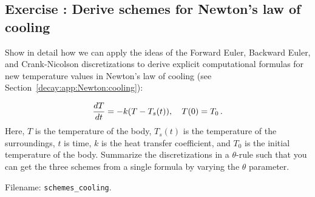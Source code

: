 \documentclass[%
oneside,                 %
final,                   %
10pt]{article}
\newenvironment{doconceexercise}{}{}
\newcounter{doconceexercisecounter}
\begin{document}
\begin{doconceexercise}

\subsection*{Exercise \thedoconceexercisecounter: Derive schemes for Newton's law of cooling}

\label{decay:app:exer:cooling:schemes}

Show in detail how we can apply the ideas of the Forward Euler,
Backward Euler, and Crank-Nicolson
discretizations to derive explicit
computational formulas for new temperature values in Newton's law of
cooling (see Section~\ref{decay:app:Newton:cooling}):

\[
\frac{dT}{dt} = -k(T-T_s(t)),\quad T(0)=T_0\tp
\]
Here, $T$ is the temperature of the body, $T_s(t)$ is the temperature
of the surroundings, $t$ is time, $k$ is the heat transfer
coefficient, and $T_0$ is the initial temperature of the body.
Summarize the discretizations in a $\theta$-rule
such that you can get the three
schemes from a single formula by varying the $\theta$ parameter.


\noindent Filename: \Verb!schemes_cooling!.

\end{doconceexercise}
\end{document}
